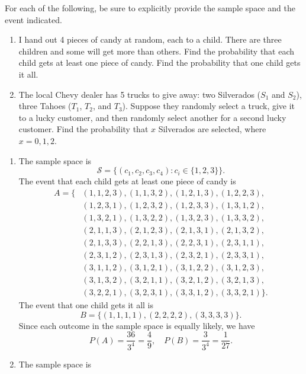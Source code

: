 \documentclass[12pt]{article}
\newenvironment{problem}[2][Problem]{\begin{trivlist}
\item[\hskip \labelsep {\bfseries #1}\hskip \labelsep {\bfseries #2.}]}
{\end{trivlist}}
\begin{document}
\begin{problem}{3}
  For each of the following, be sure to explicitly provide the sample space
  and the event indicated.
  \begin{enumerate}
    \item I hand out 4 pieces of candy at random, each to a child. There
    are three children and some will get more than others. Find the
    probability that each child gets at least one piece of candy. Find the
    probability that one child gets it all.
    \item The local Chevy dealer has 5 trucks to give away: two Silverados
    ($S_1$ and $S_2$), three Tahoes ($T_1$, $T_2$, and $T_3$). Suppose
    they randomly select a truck, give it to a lucky customer, and then
    randomly select another for a second lucky customer. Find the probability
    that $x$ Silverados are selected, where $x=0, 1, 2$.
  \end{enumerate}
  \begin{enumerate}
    \item The sample space is
    \[
      \mathcal{S} = \{(c_1, c_2, c_3, c_4) : c_i \in \{1, 2, 3\}\}.
    \]
    The event that each child gets at least one piece of candy is
    \[
      \begin{aligned}
      A = \{& (1,1,2,3), (1,1,3,2), (1,2,1,3), (1,2,2,3),\\ 
            & (1,2,3,1), (1,2,3,2), (1,2,3,3), (1,3,1,2),\\ 
            & (1,3,2,1), (1,3,2,2), (1,3,2,3), (1,3,3,2),\\
            & (2,1,1,3), (2,1,2,3), (2,1,3,1), (2,1,3,2),\\
            & (2,1,3,3), (2,2,1,3), (2,2,3,1), (2,3,1,1),\\
            & (2,3,1,2), (2,3,1,3), (2,3,2,1), (2,3,3,1),\\
            & (3,1,1,2), (3,1,2,1), (3,1,2,2), (3,1,2,3),\\
            & (3,1,3,2), (3,2,1,1), (3,2,1,2), (3,2,1,3),\\
            & (3,2,2,1), (3,2,3,1), (3,3,1,2), (3,3,2,1)\}.
      \end{aligned}
    \]
    The event that one child gets it all is
    \[
      B = \{(1,1,1,1), (2,2,2,2), (3,3,3,3)\}.
    \]
    Since each outcome in the sample space is equally likely, we have
    \[
      P(A) = \frac{36}{3^4} = \frac{4}{9}, \quad P(B) = \frac{3}{3^4} =
      \frac{1}{27}.
    \]    
    \item The sample space is

\end{enumerate}
\end{problem}
\end{document}
